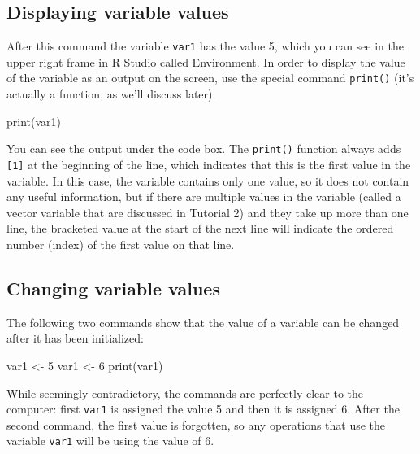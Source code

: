\documentclass[
  letterpaper,
  DIV=11,
  numbers=noendperiod]{scrreprt}
\newenvironment{Shaded}{\begin{snugshade}}{\end{snugshade}}
\newcommand{\NormalTok}[1]{\textcolor[rgb]{0.00,0.23,0.31}{#1}}
\begin{document}
\hypertarget{displaying-variable-values}{%
\subsection*{Displaying variable
values}\label{displaying-variable-values}}

After this command the variable \texttt{var1} has the value 5, which you
can see in the upper right frame in R Studio called Environment. In
order to display the value of the variable as an output on the screen,
use the special command \texttt{print()} (it's actually a function, as
we'll discuss later).

\begin{Shaded}
\begin{Highlighting}[]
\NormalTok{print(var1)}
\end{Highlighting}
\end{Shaded}

You can see the output under the code box. The \texttt{print()} function
always adds \texttt{{[}1{]}} at the beginning of the line, which
indicates that this is the first value in the variable. In this case,
the variable contains only one value, so it does not contain any useful
information, but if there are multiple values in the variable (called a
vector variable that are discussed in Tutorial 2) and they take up more
than one line, the bracketed value at the start of the next line will
indicate the ordered number (index) of the first value on that line.

\hypertarget{changing-variable-values}{%
\subsection*{Changing variable values}\label{changing-variable-values}}

The following two commands show that the value of a variable can be
changed after it has been initialized:

\begin{Shaded}
\begin{Highlighting}[]
\NormalTok{var1 \textless{}{-} 5}
\NormalTok{var1 \textless{}{-} 6}
\NormalTok{print(var1)}
\end{Highlighting}
\end{Shaded}

While seemingly contradictory, the commands are perfectly clear to the
computer: first \texttt{var1} is assigned the value 5 and then it is
assigned 6. After the second command, the first value is forgotten, so
any operations that use the variable \texttt{var1} will be using the
value of 6.
\end{document}
